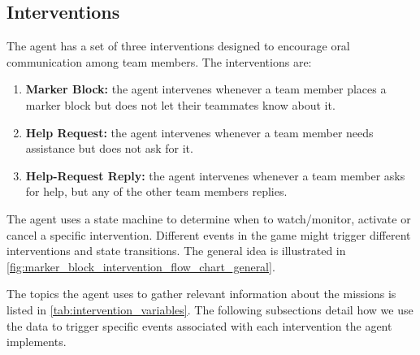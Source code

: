 \subsection{Interventions}
\label{subsec:interventions}

The agent has a set of three interventions designed to encourage oral
communication among team members. The interventions are:

\begin{enumerate}

    \item \textbf{Marker Block:} the agent intervenes whenever a team member
        places a marker block but does not let their teammates know about it.

    \item \textbf{Help Request:} the agent intervenes whenever a team member
        needs assistance but does not ask for it.

    \item \textbf{Help-Request Reply:} the agent intervenes whenever a team
        member asks for help, but any of the other team members replies.

\end{enumerate}

The agent uses a state machine to determine when to watch/monitor, activate or
cancel a specific intervention. Different events in the game might trigger
different interventions and state transitions. The general idea is illustrated
in \autoref{fig:marker_block_intervention_flow_chart_general}.

The topics the agent uses to gather relevant information about the missions is listed in \autoref{tab:intervention_variables}.
The following subsections detail how we use the data to trigger specific events associated with each intervention the agent implements.

